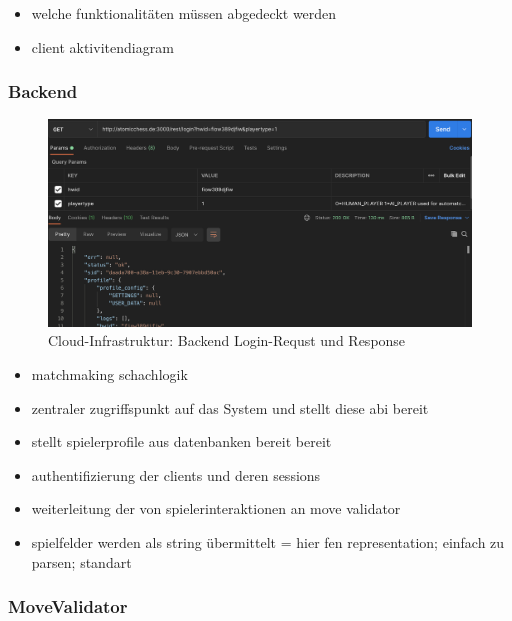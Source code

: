 \begin{itemize}
\tightlist
\item
  welche funktionalitäten müssen abgedeckt werden
\item
  client aktivitendiagram
\end{itemize}

\hypertarget{backend}{%
\subsubsection{Backend}\label{backend}}

\begin{figure}
\centering
\includegraphics{images/ATC_request_example.png}
\caption{Cloud-Infrastruktur: Backend Login-Requst und Response
\label{ATC_request_example}}
\end{figure}

\begin{itemize}
\tightlist
\item
  matchmaking schachlogik
\item
  zentraler zugriffspunkt auf das System und stellt diese abi bereit
\item
  stellt spielerprofile aus datenbanken bereit bereit
\item
  authentifizierung der clients und deren sessions
\item
  weiterleitung der von spielerinteraktionen an move validator
\item
  spielfelder werden als string übermittelt = hier fen representation;
  einfach zu parsen; standart
\end{itemize}

\hypertarget{movevalidator}{%
\subsubsection{MoveValidator}\label{movevalidator}}

